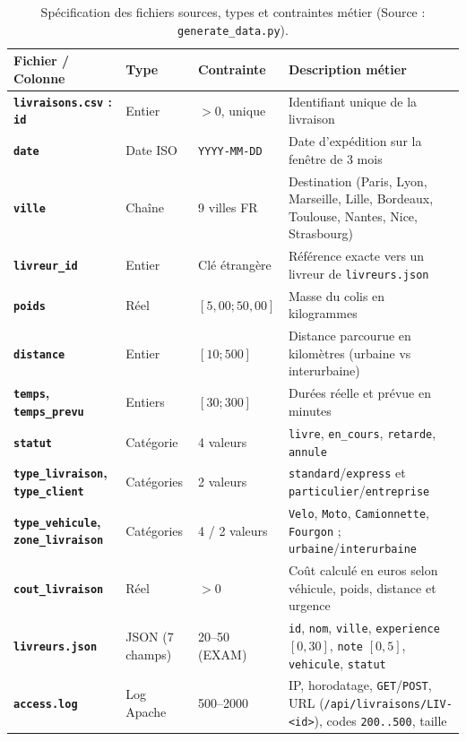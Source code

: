 \documentclass[11pt,a4paper]{article}
\begin{document}
\begin{table}[H]
\centering
\scriptsize
\begin{tabularx}{\textwidth}{@{}>{\bfseries}p{2.5cm} p{2.3cm} p{1.6cm} X@{}}
\toprule
\rowcolor{slatebg} Fichier / Colonne & Type & Contrainte & Description m\'etier \\
\midrule
\texttt{livraisons.csv} : \texttt{id} & Entier & $>0$, unique & Identifiant unique de la livraison \\
\rowcolor{rowalt} \texttt{date} & Date ISO & \texttt{YYYY-MM-DD} & Date d'exp\'edition sur la fen\^etre de 3 mois \\
\texttt{ville} & Cha\^ine & 9 villes FR & Destination (Paris, Lyon, Marseille, Lille, Bordeaux, Toulouse, Nantes, Nice, Strasbourg) \\
\rowcolor{rowalt} \texttt{livreur\_id} & Entier & Cl\'e \'etrang\`ere & R\'ef\'erence exacte vers un livreur de \texttt{livreurs.json} \\
\texttt{poids} & R\'eel & $[5,00 ; 50,00]$ & Masse du colis en kilogrammes \\
\rowcolor{rowalt} \texttt{distance} & Entier & $[10 ; 500]$ & Distance parcourue en kilom\`etres (urbaine vs interurbaine) \\
\texttt{temps}, \texttt{temps\_prevu} & Entiers & $[30 ; 300]$ & Dur\'ees r\'eelle et pr\'evue en minutes \\
\rowcolor{rowalt} \texttt{statut} & Cat\'egorie & 4 valeurs & \texttt{livre}, \texttt{en\_cours}, \texttt{retarde}, \texttt{annule} \\
\texttt{type\_livraison}, \texttt{type\_client} & Cat\'egories & 2 valeurs & \texttt{standard}/\texttt{express} et \texttt{particulier}/\texttt{entreprise} \\
\rowcolor{rowalt} \texttt{type\_vehicule}, \texttt{zone\_livraison} & Cat\'egories & 4 / 2 valeurs & \texttt{Velo}, \texttt{Moto}, \texttt{Camionnette}, \texttt{Fourgon} ; \texttt{urbaine}/\texttt{interurbaine} \\
\texttt{cout\_livraison} & R\'eel & $>0$ & Co\^ut calcul\'e en euros selon v\'ehicule, poids, distance et urgence \\
\rowcolor{rowalt} \texttt{livreurs.json} & JSON (7 champs) & 20--50 (EXAM) & \texttt{id}, \texttt{nom}, \texttt{ville}, \texttt{experience} $[0,30]$, \texttt{note} $[0,5]$, \texttt{vehicule}, \texttt{statut} \\
\texttt{access.log} & Log Apache & 500--2000 & IP, horodatage, \texttt{GET}/\texttt{POST}, URL (\texttt{/api/livraisons/LIV-<id>}), codes \texttt{200..500}, taille \\
\bottomrule
\end{tabularx}
\caption{Sp\'ecification des fichiers sources, types et contraintes m\'etier (Source : \texttt{generate\_data.py}).}
\end{table}
\end{document}

